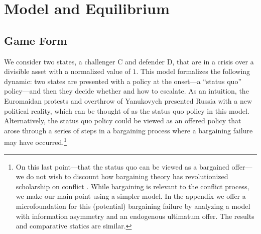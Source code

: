 \documentclass[11pt,letterpaper,pdftex,dvipsnames,table]{article}
\begin{document}
\section{Model and Equilibrium} \label{model}
\subsection{Game Form}
We consider two states, a challenger C and defender D, that are in a crisis over a divisible asset with a normalized value of $1$. This model formalizes the following dynamic: two states are presented with a policy at the onset---a ``status quo'' policy---and then they decide whether and how to escalate. As an intuition, the Euromaidan protests and overthrow of Yanukovych presented Russia with a new political reality, which can be thought of as the status quo policy in this model. Alternatively, the status quo policy could be viewed as an offered policy that arose through a series of steps in a  bargaining process where a bargaining failure may have occurred.\footnote{On this last point---that  the status quo can be viewed as a bargained offer---we do not wish to discount how bargaining theory has revolutionized scholarship on conflict \citep{fearon_rationalistexplanationswar_1995, wagner_bargainingwar_2000, filson_bargainingmodelwar_2002, smith_bargainingnaturewar_2004, powell_warcommitmentproblem_2006, slantchev_militarythreatscosts_2011, fey_uncertaintyincentivescrisis_2011, ramsay_informationuncertaintywar_2017, spaniel_bargainingbombsuccesses_2019}. While bargaining is relevant to the conflict process, we make our main point using a simpler model. In the appendix we offer a microfoundation for this (potential) bargaining failure by analyzing a model with information asymmetry and an endogenous ultimatum offer. The results and comparative statics are similar.}
    
\end{document}
